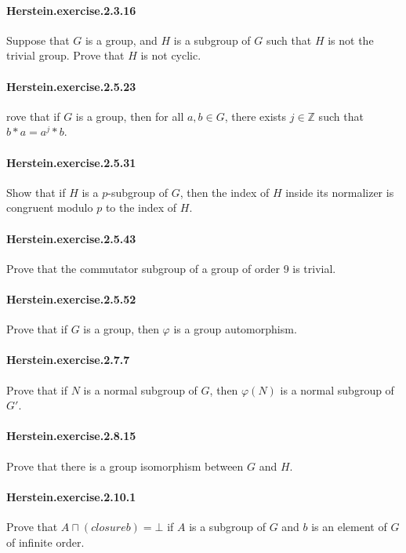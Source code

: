 \documentclass{article}
\begin{document}
\paragraph{Herstein.exercise.2.3.16} Suppose that $G$ is a group, and $H$ is a subgroup of $G$ such that $H$ is not the trivial group. Prove that $H$ is not cyclic.

\paragraph{Herstein.exercise.2.5.23} rove that if $G$ is a group, then for all $a, b \in G$, there exists $j \in \mathbb{Z}$ such that $b*a = a^j * b$.

\paragraph{Herstein.exercise.2.5.31} Show that if $H$ is a $p$-subgroup of $G$, then the index of $H$ inside its normalizer is congruent modulo $p$ to the index of $H$.

\paragraph{Herstein.exercise.2.5.43} Prove that the commutator subgroup of a group of order 9 is trivial.

\paragraph{Herstein.exercise.2.5.52} Prove that if $G$ is a group, then $φ$ is a group automorphism.

\paragraph{Herstein.exercise.2.7.7} Prove that if $N$ is a normal subgroup of $G$, then $φ(N)$ is a normal subgroup of $G'$.

\paragraph{Herstein.exercise.2.8.15} Prove that there is a group isomorphism between $G$ and $H$.

\paragraph{Herstein.exercise.2.10.1} Prove that $A ⊓ (closure {b}) = ⊥$ if $A$ is a subgroup of $G$ and $b$ is an element of $G$ of infinite order.
\end{document}
